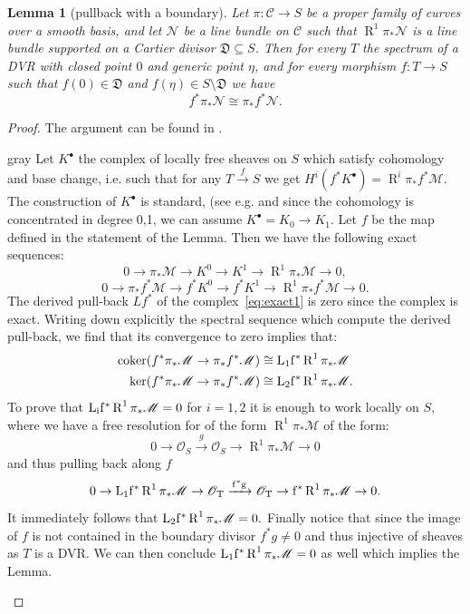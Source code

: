 \documentclass[11pt]{amsart}
\newcommand{\OO}{\mathcal O}
\renewcommand{\to}{\rightarrow}
\newcommand{\cC}{\mathcal C}
\newcommand{\R}{\operatorname{R}}
\theoremstyle{plain}
\newtheorem{lem}[thm]{Lemma}
\theoremstyle{definition}
\begin{document}
\begin{lem}[pullback with a boundary]\label{DVR}
Let $\pi\colon\cC\to S$ be a proper family of curves over a smooth basis, and let $\mathcal N$ be a line bundle on $\cC$ such that $\R^1\pi_*\mathcal N$ is a line bundle supported on a Cartier divisor $\mathfrak D\subseteq S$. Then for every $T$ the spectrum of a DVR with closed point $0$ and generic point $\eta$, and for every morphism $f\colon T\to S$ such that $f(0)\in\mathfrak D$ and $f(\eta)\in S\setminus\mathfrak D$ we have
\[f^*\pi_*\mathcal N\cong \pi_*f^*\mathcal N.\]
\end{lem}
\begin{proof}
The argument can be found in \cite[Lemmma~3.7.2.2]{RSPW}.
\begin{color}{gray}{
Let $K^{\bullet}$ the complex of locally free sheaves on $S$ which satisfy cohomology and base change, i.e. such that for any $T\xrightarrow{f} S$  we get
$H^i(f^*K^{\bullet})=\R^i\pi_*f^*\mathcal M.$ The construction of $K^{\bullet}$ is standard, (see e.g. \cite[Proposition~12.2]{HAR} and since the cohomology is concentrated in degree 0,1, we can assume $K^{\bullet}=K_0\to K_1.$ Let $f$ be the map defined in the statement of the Lemma.
Then we have the following exact sequences:
\begin{equation}\label{eq:exact1}
0\to \pi_*\mathcal M\to K^0\to K^1\to \R^1\pi_*\mathcal M\to 0,
\end{equation}
\begin{equation}\label{eq:exact2}
0\to \pi_*f^*\mathcal M\to f^*K^0\to f^*K^1\to \R^1\pi_*f^*\mathcal M\to 0.
\end{equation}
The derived pull-back $Lf^*$ of the complex~\eqref{eq:exact1} is zero since the complex is exact. Writing down explicitly the spectral sequence which compute the derived pull-back, we find that its convergence to zero implies that:
\begin{align*}
\operatorname{coker}(f^*\pi_*\mathcal M\to\pi_*f^*\mathcal M)&\cong \rm{L}_1f^*\R^1\pi_*\mathcal M\\
\operatorname{ker}(f^*\pi_*\mathcal M\to\pi_*f^*\mathcal M)&\cong \rm{L}_2f^*\R^1\pi_*\mathcal M.
\end{align*} 
To prove that $\rm{L}_if^*\R^1\pi_*\mathcal M=0$ for $i=1,2$ it is enough to work locally on $S$, where we have a free resolution for  of the form $\R^1\pi_*\mathcal M$ of the form:
\[0\rightarrow \OO_S\xrightarrow{g}\OO_S\rightarrow \R^1\pi_*\mathcal M\rightarrow 0\] 
and thus pulling back along $f$
\[0\rightarrow  \rm{L}_1f^*\R^1\pi_*\mathcal M \to \OO_T\xrightarrow{f^*g}\OO_T\rightarrow f^*\R^1\pi_*\mathcal M\rightarrow 0.\] 
It immediately follows that $ \rm{L}_2f^*\R^1\pi_*\mathcal M=0.$ Finally notice that since the image of $f$ is not contained in the boundary divisor $f^*g\neq 0$ and thus injective of sheaves as $T$ is a DVR. We can then conclude $ \rm{L}_1f^*\R^1\pi_*\mathcal M=0$ as well which implies the Lemma.}\end{color}
\end{proof}
\end{document}
